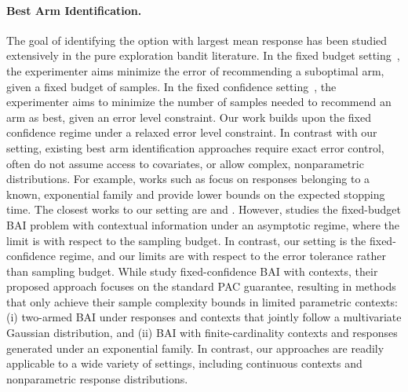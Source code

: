 \documentclass{article}
\begin{document}
\paragraph{Best Arm Identification.} The goal of identifying the option with largest mean response has been studied extensively in the pure exploration bandit literature. In the fixed budget setting~\citep{fixed_budget, bai}, the experimenter aims minimize the error of recommending a suboptimal arm, given a fixed budget of samples. In the fixed confidence setting~\citep{garivier2016optimalbestarmidentification, russo2018simplebayesianalgorithmsbest, bai_healthcare}, the experimenter aims to minimize the number of samples needed to recommend an arm as best, given an error level constraint. Our work builds upon the fixed confidence regime under a relaxed error level constraint. In contrast with our setting, existing best arm identification approaches require exact error control, often do not assume access to covariates, or allow complex, nonparametric distributions. For example, works such as \citet{garivier2016optimalbestarmidentification} focus on responses belonging to a known, exponential family and provide lower bounds on the expected stopping time. The closest works to our setting are \cite{kato2023bestarmidentificationcontextual} and \cite{kato2024rolecontextualinformationbest}. However, \cite{kato2023bestarmidentificationcontextual} studies the fixed-budget BAI problem with contextual information under an asymptotic regime, where the limit is with respect to the sampling budget. In contrast, our setting is the fixed-confidence regime, and our limits are with respect to the error tolerance rather than sampling budget. While \cite{kato2024rolecontextualinformationbest} study fixed-confidence BAI with contexts, their proposed approach focuses on the standard PAC guarantee, resulting in methods that only achieve their sample complexity bounds in limited parametric contexts: (i) two-armed BAI under responses and contexts that jointly follow a multivariate Gaussian distribution, and (ii) BAI with finite-cardinality contexts and responses generated under an exponential family. In contrast, our approaches are readily applicable to a wide variety of settings, including continuous contexts and nonparametric response distributions.
\end{document}
